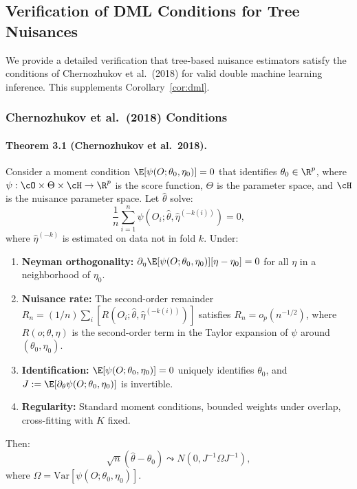 \subsection{Verification of DML Conditions for Tree Nuisances}
\label{app:dml-verification}

We provide a detailed verification that tree-based nuisance estimators satisfy the conditions of Chernozhukov et al.\ (2018) for valid double machine learning inference. This supplements Corollary~\ref{cor:dml}.

\subsubsection{Chernozhukov et al.\ (2018) Conditions}

\paragraph{Theorem 3.1 (Chernozhukov et al.\ 2018).}
Consider a moment condition $\E[\psi(O; \theta_0, \eta_0)] = 0$ that identifies $\theta_0 \in \R^p$, where $\psi: \cO \times \Theta \times \cH \to \R^p$ is the score function, $\Theta$ is the parameter space, and $\cH$ is the nuisance parameter space. Let $\hat\theta$ solve:
\[
\frac{1}{n} \sum_{i=1}^n \psi(O_i; \hat\theta, \hat\eta^{(-k(i))}) = 0,
\]
where $\hat\eta^{(-k)}$ is estimated on data not in fold $k$. Under:

\begin{enumerate}[label=\textbf{(C\arabic*)}]
\item \textbf{Neyman orthogonality:} $\partial_\eta \E[\psi(O; \theta_0, \eta_0)][\eta - \eta_0] = 0$ for all $\eta$ in a neighborhood of $\eta_0$.
\item \textbf{Nuisance rate:} The second-order remainder $R_n = (1/n)\sum_i [R(O_i; \hat\theta, \hat\eta^{(-k(i))})]$ satisfies $R_n = o_p(n^{-1/2})$, where $R(o; \theta, \eta)$ is the second-order term in the Taylor expansion of $\psi$ around $(\theta_0, \eta_0)$.
\item \textbf{Identification:} $\E[\psi(O; \theta_0, \eta_0)] = 0$ uniquely identifies $\theta_0$, and $J := \E[\partial_\theta \psi(O; \theta_0, \eta_0)]$ is invertible.
\item \textbf{Regularity:} Standard moment conditions, bounded weights under overlap, cross-fitting with $K$ fixed.
\end{enumerate}

Then:
\[
\sqrt{n}(\hat\theta - \theta_0) \leadsto N(0, J^{-1} \Omega J^{-1}),
\]
where $\Omega = \text{Var}[\psi(O; \theta_0, \eta_0)]$.

